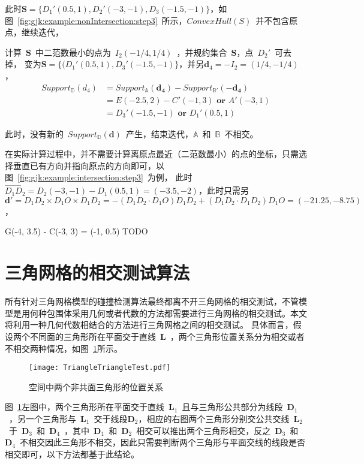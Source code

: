 此时$\bm{S} = \{D_1'(0.5, 1), D_2'(-3, -1), D_3(-1.5, -1)\}$，如图~\ref{fig:gjk:example:nonIntersection:step3}~所示，$ConvexHull(S)$~并不包含原点，继续迭代，

计算~$\bm{S}$~中二范数最小的点为~$I_2(-1/4, 1/4)$~，并规约集合~$\bm{S}$，点~$D_2'$~可去掉，
变为$\bm{S} = \{ (D_1'(0.5, 1), D_3'(-1.5, -1)\}$，并另$\bm{d}_4 = -I_2 = (1/4, -1/4)$，
\begin{equation}
  \begin{array}{ll}
  Support_\mathbb{D}(d_4)  & = Support_\mathbb{A}(\bm{d_4}) - Support_\mathbb{B'}(-\bm{d_4}) \\
    & = E(-2.5, 2) - C'(-1, 3) \textbf{~or~} A'(-3, 1)  \\
    & = D_3'(-1.5, -1) \textbf{~or~} D_1'(0.5, 1)
  \end{array}
  \label{euqa:gjk:non:step4}
\end{equation}

此时，没有新的~$Support_\mathbb{D}(\bm{d})$~产生，结束迭代，$\mathbb{A}$~和~$\mathbb{B}$~不相交。

在实际计算过程中，并不需要计算离原点最近（二范数最小）的点的坐标，只需选择垂直已有方向并指向原点的方向即可，以图~\ref{fig:gjk:example:intersection:step3}~为例，
此时~$\overrightarrow{D_1D_2} = D_2(-3, -1) - D_1(0.5, 1) = (-3.5, -2)$，此时只需另~
$\bm{d'} = D_1D_2 \times D_1O \times D_1D_2 = -(D_1D_2 \cdot D_1O)D_1D_2 + (D_1D_2 \cdot D_1D_2)D_1O = (-21.25,-8.75)$，

G(-4, 3.5) - C(-3, 3) = (-1, 0.5) TODO

\section{三角网格的相交测试算法}
\label{sec:intersection:triangles}

所有针对三角网格模型的碰撞检测算法最终都离不开三角网格的相交测试，不管模型是用何种包围体采用几何或者代数的方法都需要进行三角网格的相交测试。本文将利用一种几何代数相结合的方法进行三角网格之间的相交测试。
具体而言，假设两个不同面的三角形所在平面交于直线~$\bm{L}$~，两个三角形位置关系分为相交或者不相交两种情况，如图~\ref{fig:two:triangle:ui}所示。

\begin{figure}[htbp]
  \centering
    \texttt{[image: TriangleTriangleTest.pdf]}
    \caption{空间中两个非共面三角形的位置关系\cite{Moller1997}}
  \label{fig:two:triangle:ui}
\end{figure}

图~\ref{fig:two:triangle:ui}左图中，两个三角形所在平面交于直线~$\bm{L}_1$~且与三角形公共部分为线段~$\bm{D}_1$~，另一个三角形与~$\bm{L}_1$~交于线段$\bm{D}_2$，相应的右图两个三角形分别交公共交线~$\bm{L}_2$~于~$\bm{D}_3$~和~$\bm{D}_4$~，其中~$\bm{D}_1$~和~$\bm{D}_2$~相交可以推出两个三角形相交，反之~$\bm{D}_3$~和~$\bm{D}_4$~不相交因此三角形不相交，因此只需要判断两个三角形与平面交线的线段是否相交即可\cite{Moller1997}，以下方法都基于此结论。

